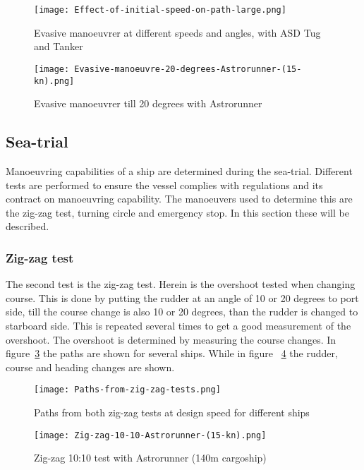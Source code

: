 \begin{figure}[hb]
	\centering
	\texttt{[image: Effect-of-initial-speed-on-path-large.png]}
	\caption{Evasive manoeuvrer at different speeds and angles, with ASD Tug and Tanker}
	\label{fig:evasive-manoeuvrer}
\end{figure}

\begin{figure}[hb]
	\centering
	\texttt{[image: Evasive-manoeuvre-20-degrees-Astrorunner-(15-kn).png]}
	\caption{Evasive manoeuvrer till 20 degrees with Astrorunner}
	\label{fig:astrorunner-evasive-20}
\end{figure}

\subsection{Sea-trial}
Manoeuvring capabilities of a ship are determined during the sea-trial. Different tests are performed to ensure the vessel complies with regulations and its contract on manoeuvring capability. The manoeuvers used to determine this are the zig-zag test, turning circle and emergency stop. In this section these will be described.

\subsubsection{Zig-zag test}
The second test is the zig-zag test. Herein is the overshoot tested when changing course. This is done by putting the rudder at an angle of 10 or 20 degrees to port side, till the course change is also 10 or 20 degrees, than the rudder is changed to starboard side. This is repeated several times to get a good measurement of the overshoot. The overshoot is determined by measuring the course changes. In figure~\ref{fig:zig-zag-paths} the paths are shown for several ships. While in figure~ \ref{fig:astrorunner-zig-zag-10} the rudder, course and heading changes are shown.

\begin{figure}[hb]
	\centering
	\texttt{[image: Paths-from-zig-zag-tests.png]}
	\caption{Paths from both zig-zag tests at design speed for different ships}
	\label{fig:zig-zag-paths}
\end{figure}

\begin{figure}[hb]
	\centering
	\texttt{[image: Zig-zag-10-10-Astrorunner-(15-kn).png]}
	\caption{Zig-zag 10:10 test with Astrorunner (140m cargoship)}
	\label{fig:astrorunner-zig-zag-10}
\end{figure}


